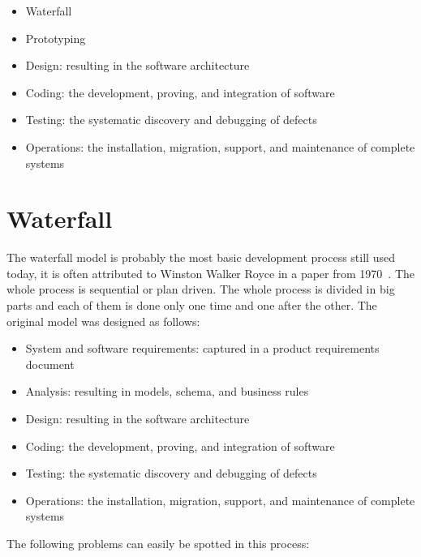 \documentclass[12pt]{article}
\theoremstyle{definition}
\theoremstyle{definition}
\theoremstyle{remark}
\begin{document}
\begin{itemize}
\item Waterfall
\item Prototyping
\item Design: resulting in the software architecture
\item Coding: the development, proving, and integration of software
\item Testing: the systematic discovery and debugging of defects
\item Operations: the installation, migration, support, and maintenance of complete systems
\end{itemize}


\clearpage



\section{Waterfall}


The waterfall model is probably the most basic development process still used today, it is often attributed to Winston Walker Royce in a paper from 1970~\cite{BARYWBoehm:1987}. The whole process is sequential or plan driven. The whole process is divided in big parts and each of them is done only one time and one after the other. The original model was designed as follows:\\

\begin{itemize}

\item System and software requirements: captured in a product requirements document
\item Analysis: resulting in models, schema, and business rules
\item Design: resulting in the software architecture
\item Coding: the development, proving, and integration of software
\item Testing: the systematic discovery and debugging of defects
\item Operations: the installation, migration, support, and maintenance of complete systems

\end{itemize}

The following problems can easily be spotted in this process:
\end{document}
